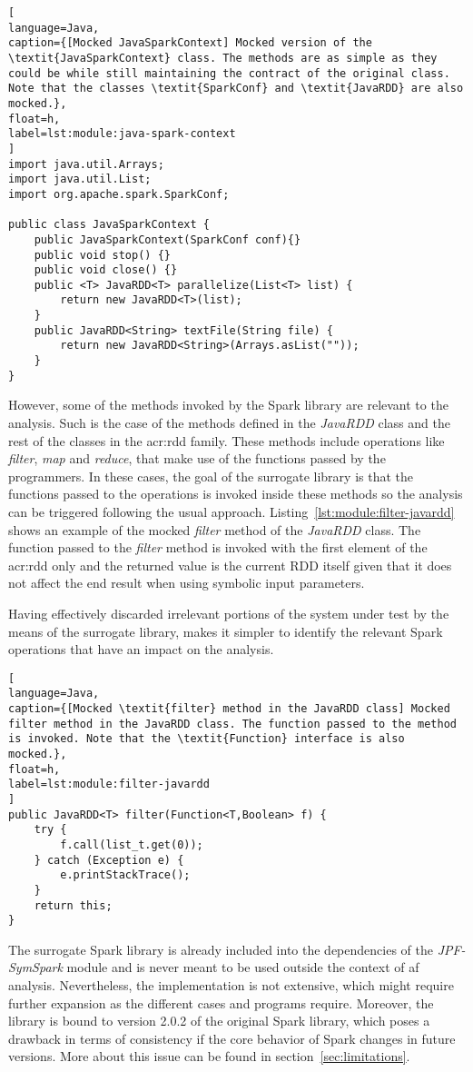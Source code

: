 \begin{lstlisting}[
language=Java,
caption={[Mocked JavaSparkContext] Mocked version of the \textit{JavaSparkContext} class. The methods are as simple as they could be while still maintaining the contract of the original class. Note that the classes \textit{SparkConf} and \textit{JavaRDD} are also mocked.},
float=h,
label=lst:module:java-spark-context
]
import java.util.Arrays;
import java.util.List;
import org.apache.spark.SparkConf;

public class JavaSparkContext {	
	public JavaSparkContext(SparkConf conf){}
	public void stop() {}	
	public void close() {}
	public <T> JavaRDD<T> parallelize(List<T> list) {		
		return new JavaRDD<T>(list);
	}
	public JavaRDD<String> textFile(String file) {
		return new JavaRDD<String>(Arrays.asList(""));
	}
}
\end{lstlisting}

However, some of the methods invoked by the Spark library are relevant to the analysis. Such is the case of the methods defined in the \textit{JavaRDD} class and the rest of the classes in the \acrshort{acr:rdd} family. These methods include operations like \textit{filter}, \textit{map} and \textit{reduce}, that make use of the functions passed by the programmers. In these cases, the goal of the surrogate library is that the functions passed to the operations is invoked inside these methods so the analysis can be triggered following the usual \spf{} approach. Listing~\ref{lst:module:filter-javardd} shows an example of the mocked \textit{filter} method of the \textit{JavaRDD} class. The function passed to the \textit{filter} method is invoked with the first element of the \acrshort{acr:rdd} only and the returned value is the current RDD itself given that it does not affect the end result when using symbolic input parameters.

Having effectively discarded irrelevant portions of the system under test by the means of the surrogate library, makes it simpler to identify the relevant Spark operations that have an impact on the analysis.

\begin{lstlisting}[
language=Java,
caption={[Mocked \textit{filter} method in the JavaRDD class] Mocked filter method in the JavaRDD class. The function passed to the method is invoked. Note that the \textit{Function} interface is also mocked.},
float=h,
label=lst:module:filter-javardd
]
public JavaRDD<T> filter(Function<T,Boolean> f) {		
	try {
		f.call(list_t.get(0));
	} catch (Exception e) {
		e.printStackTrace();
	}
	return this;
}
\end{lstlisting}

The surrogate Spark library is already included into the dependencies of the \textit{JPF-SymSpark} module and is never meant to be used outside the context of af analysis. Nevertheless, the implementation is not extensive, which might require further expansion as the different cases and programs require. Moreover, the library is bound to version 2.0.2 of the original Spark library, which poses a drawback in terms of consistency if the core behavior of Spark changes in future versions. More about this issue can be found in section~\ref{sec:limitations}.